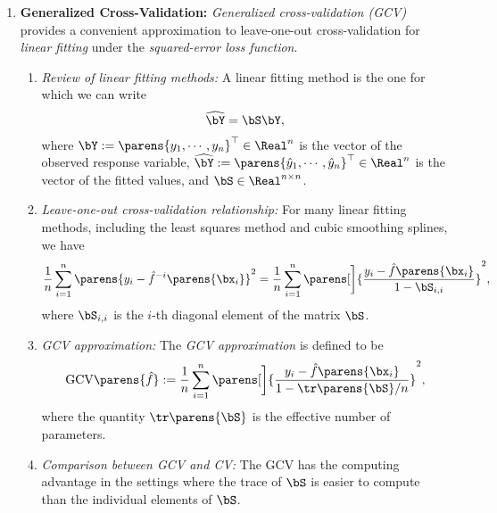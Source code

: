 \documentclass[12pt]{article}
\begin{document}
\begin{enumerate}[label=\textbf{\arabic*.}]
	\item \textbf{Generalized Cross-Validation:} \emph{Generalized cross-validation (GCV)} provides a convenient approximation to leave-one-out cross-validation for \emph{linear fitting} under the \textit{squared-error loss function}. 
	\begin{enumerate}
		\item \textit{Review of linear fitting methods:} A linear fitting method is the one for which we can write 
		\begin{align*}
			\widehat{\bY} = \bS \bY, 
		\end{align*}
		where $\bY := \parens{y_1, \cdots, y_n}^\top \in \Real^n$ is the vector of the observed response variable, $\widehat{\bY} := \parens{\hat{y}_1, \cdots, \hat{y}_n}^\top \in \Real^n$ is the vector of the fitted values, and $\bS \in \Real^{n \times n}$. 
		
		\item \textit{Leave-one-out cross-validation relationship:} For many linear fitting methods, including the least squares method and cubic smoothing splines, we have 
		\begin{align*}
			\frac{1}{n} \sum_{i=1}^n \parens{y_i - \hat{f}^{-i} \parens{\bx_i}}^2 = \frac{1}{n} \sum_{i=1}^n \parens[\bigg]{\frac{y_i - \hat{f}\parens{\bx_i}}{1 - \bS_{i,i}}}^2, 
		\end{align*}
		where $\bS_{i,i}$ is the $i$-th diagonal element of the matrix $\bS$. 
		
		\item \textit{GCV approximation:} The \emph{GCV approximation} is defined to be 
		\begin{align}\label{eq-gcv}
			\mathrm{GCV} \parens{\hat{f}} := \frac{1}{n} \sum_{i=1}^n \parens[\bigg]{\frac{y_i - \hat{f} \parens{\bx_i}}{1 - \tr \parens{\bS}/n}}^2, 
		\end{align}
		where the quantity $\tr\parens{\bS}$ is the effective number of parameters. 
		
		\item \textit{Comparison between GCV and CV:} The GCV has the computing advantage in the settings where the trace of $\bS$ is easier to compute than the individual elements of $\bS$. 


\end{enumerate}
\end{enumerate}
\end{document}
